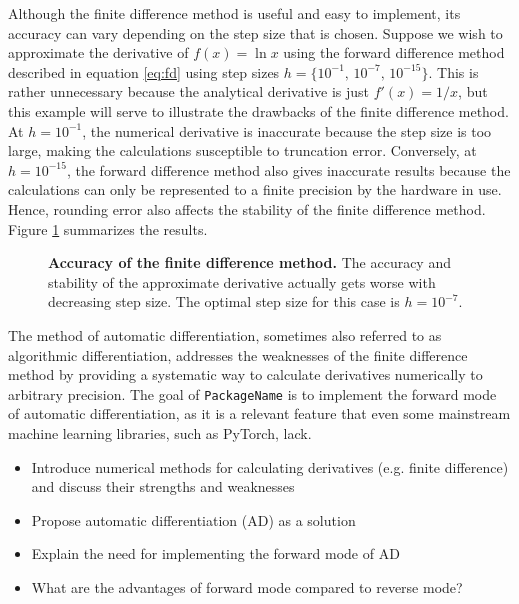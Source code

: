     Although the finite difference method is useful and easy to implement, its 
    accuracy can vary depending on the step size that is chosen. Suppose we wish
    to approximate the derivative of $f(x)=\ln x$ using the forward difference 
    method described in equation \eqref{eq:fd} using step sizes $h=\{10^{-1},\,
    10^{-7},\,10^{-15}\}$. This is rather unnecessary because the analytical 
    derivative is just $f'(x) = 1/x$, but this example will serve to illustrate 
    the drawbacks of the finite difference method. At $h=10^{-1}$, the numerical
    derivative is inaccurate because the step size is too large, making the 
    calculations susceptible to truncation error. Conversely, at $h=10^{-15}$, 
    the forward difference method also gives inaccurate results because the 
    calculations can only be represented to a finite precision by the hardware 
    in use. Hence, rounding error also affects the stability of the finite 
    difference method. Figure \ref{fig:fd-accuracy} summarizes the results.
    \begin{figure}
        \centering
        
        \caption{\textbf{Accuracy of the finite difference method.} The accuracy
        and stability of the approximate derivative actually gets worse with 
        decreasing step size. The optimal step size for this case is 
        $h=10^{-7}$.}
        \label{fig:fd-accuracy}
    \end{figure}
    
    The method of automatic differentiation, sometimes also referred to as 
    algorithmic differentiation, addresses the weaknesses of the finite 
    difference method by providing a systematic way to calculate derivatives 
    numerically to arbitrary precision. The goal of \texttt{PackageName} is to 
    implement the forward mode of automatic differentiation, as it is a relevant
    feature that even some mainstream machine learning libraries, such as 
    PyTorch, lack. 
    \begin{itemize}
        \item Introduce numerical methods for calculating derivatives (e.g. 
        finite difference) and discuss their strengths and weaknesses
        \item Propose automatic differentiation (AD) as a solution
        \item Explain the need for implementing the forward mode of AD
        \item What are the advantages of forward mode compared to reverse mode?
    \end{itemize}
